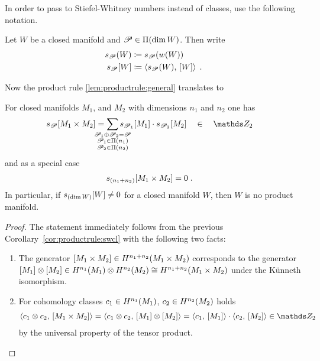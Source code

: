 In order to pass to Stiefel-Whitney numbers instead of classes, use
the following notation.
\begin{Def}
  Let $W$ be a closed manifold and $\mathscr{P}\in\Pi({\dim W})$.
  Then write
  \begin{align*}
    s_{\mathscr{P}}(W) &\coloneqq s_{\mathscr{P}}({w}(W))\\
    s_{\mathscr{P}}[W] &\coloneqq \left\langle s_{\mathscr{P}}(W),\, [W] \right\rangle
    \;.
  \end{align*}
\end{Def}

Now the product rule \autoref{lem:productrule:general} translates to
\begin{Cor}
  For closed manifolds $M_1$, and $M_2$ with dimensions $n_1$ and
  $n_2$ one has
  \begin{align*}
    \snum{\Part}{M_1\times M_2}
    &= \sum_{\mathclap{\substack{
      \Part_1\concat\Part_2=\Part\\
    \Part_1\in\PartitionsOf{n_1}\\
    \Part_2\in\PartitionsOf{n_2}\\
    }}}
    \snum{\Part_1}{M_1} \cdot \snum{\Part_2}{M_2}
    \quad \in \quad \Zmod2
  \end{align*}
  and as a special case
  \begin{align}
    \label{eq:productrule:swnum}
    s_{(n_1+n_2)}[M_1\times M_2] &= 0
                                      \;.
  \end{align}
  In particular, if $s_{(\dim W)}[W]\neq 0$ for a closed manifold
  $W$, then $W$ is no product manifold.
  \begin{proof}
    The statement immediately follows from the previous
    Corollary~\autoref{cor:productrule:swcl} with the following
    two facts:
    \begin{enumerate}
    \item The generator $[M_1\times
        M_2]\in H^{n_1+n_2}(M_1\times M_2)$ corresponds to the generator
      $[M_1]\otimes[M_2]\in
      H^{n_1}(M_1)\otimes H^{n_2}(M_2)\cong H^{n_1+n_2}(M_1\times M_2)$
      under the Künneth isomorphism.
    \item For cohomology classes $c_1\in H^{n_1}(M_1)$, $c_2\in H^{n_2}(M_2)$ holds
      \begin{gather*}
        \capped{c_1\otimes c_2}{\fundcl{M_1\times M_2}}
        = \capped{c_1\otimes c_2}{\fundcl{M_1}\otimes\fundcl{M_2}}
        = \capped{c_1}{\fundcl{M_1}} \cdot \capped{c_2}{\fundcl{M_2}}
        \in \Zmod2
      \end{gather*}
      by the universal property of the tensor product.
      \qedhere
    \end{enumerate}    
  \end{proof}
\end{Cor}

